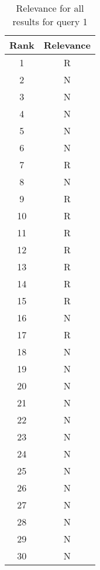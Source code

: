 
\begin{table}[H]
    \centering
    \begin{tabular}{|c|c|}
    \hline
    \rowcolor[gray]{0.9} Rank & Relevance \\ \hline
    1 & R \\ \hline
2 & N \\ \hline
3 & N \\ \hline
4 & N \\ \hline
5 & N \\ \hline
6 & N \\ \hline
7 & R \\ \hline
8 & N \\ \hline
9 & R \\ \hline
10 & R \\ \hline
11 & R \\ \hline
12 & R \\ \hline
13 & R \\ \hline
14 & R \\ \hline
15 & R \\ \hline
16 & N \\ \hline
17 & R \\ \hline
18 & N \\ \hline
19 & N \\ \hline
20 & N \\ \hline
21 & N \\ \hline
22 & N \\ \hline
23 & N \\ \hline
24 & N \\ \hline
25 & N \\ \hline
26 & N \\ \hline
27 & N \\ \hline
28 & N \\ \hline
29 & N \\ \hline
30 & N \\ \hline

    \end{tabular}
    \caption{Relevance for all results for query 1}
    \label{tab:query1_results}
\end{table}
    


